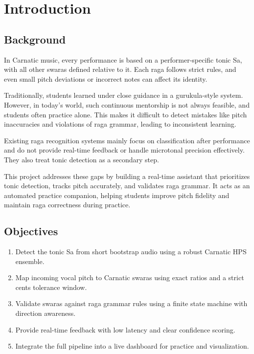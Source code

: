 \documentclass[12pt,a4paper]{report}
\numberwithin{equation}{chapter}
\begin{document}
\newpage
{}
\setcounter{page}{1}
\pagestyle{mainstyle}

\chapter{Introduction}
\section{Background}
In Carnatic music, every performance is based on a performer-specific tonic Sa, with all other swaras defined relative to it. Each raga follows strict rules, and even small pitch deviations or incorrect notes can affect its identity.

Traditionally, students learned under close guidance in a gurukula-style system. However, in today’s world, such continuous mentorship is not always feasible, and students often practice alone. This makes it difficult to detect mistakes like pitch inaccuracies and violations of raga grammar, leading to inconsistent learning.

Existing raga recognition systems mainly focus on classification after performance and do not provide real-time feedback or handle microtonal precision effectively. They also treat tonic detection as a secondary step.

This project addresses these gaps by building a real-time assistant that prioritizes tonic detection, tracks pitch accurately, and validates raga grammar. It acts as an automated practice companion, helping students improve pitch fidelity and maintain raga correctness during practice.

\section{Objectives}
\begin{enumerate}
    \item Detect the tonic Sa from short bootstrap audio using a robust Carnatic HPS ensemble.
    \item Map incoming vocal pitch to Carnatic swaras using exact ratios and a strict cents tolerance window.
    \item Validate swaras against raga grammar rules using a finite state machine with direction awareness.
    \item Provide real-time feedback with low latency and clear confidence scoring.
    \item Integrate the full pipeline into a live dashboard for practice and visualization.
\end{enumerate}
\end{document}
